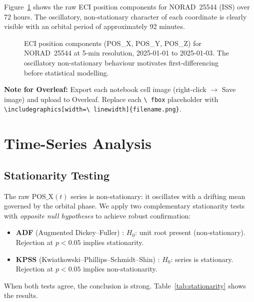 \documentclass[conference]{IEEEtran}
\begin{document}
Figure~\ref{fig:eci_raw} shows the raw ECI position components for
NORAD~25544 (ISS) over 72 hours. The oscillatory, non-stationary character
of each coordinate is clearly visible with an orbital period of
approximately 92 minutes.

\begin{figure}[H]
  \centering
  \fbox{\rule{0pt}{4cm}\rule{\linewidth}{0pt}}
  \caption{ECI position components (POS\_X, POS\_Y, POS\_Z) for NORAD~25544
           at 5-min resolution, 2025-01-01 to 2025-01-03. The oscillatory
           non-stationary behaviour motivates first-differencing before
           statistical modelling.}
  \label{fig:eci_raw}
\end{figure}

\textbf{Note for Overleaf:} Export each notebook cell image (right-click
$\to$ Save image) and upload to Overleaf. Replace each \texttt{\textbackslash
fbox} placeholder with \texttt{\textbackslash includegraphics[width=\textbackslash
linewidth]\{filename.png\}}.

\section{Time-Series Analysis}
\label{sec:ts}

\subsection{Stationarity Testing}

The raw $\text{POS\_X}(t)$ series is non-stationary: it oscillates with a
drifting mean governed by the orbital phase. We apply two complementary
stationarity tests with \emph{opposite null hypotheses} to achieve robust
confirmation:
\begin{itemize}
  \item \textbf{ADF} (Augmented Dickey--Fuller) \cite{dickey1979}:
        $H_0$: unit root present (non-stationary). Rejection at $p < 0.05$
        implies stationarity.
  \item \textbf{KPSS} (Kwiatkowski--Phillips--Schmidt--Shin) \cite{kpss1992}:
        $H_0$: series is stationary. Rejection at $p < 0.05$ implies
        non-stationarity.
\end{itemize}

When both tests agree, the conclusion is strong. Table~\ref{tab:stationarity}
shows the results.
\end{document}
